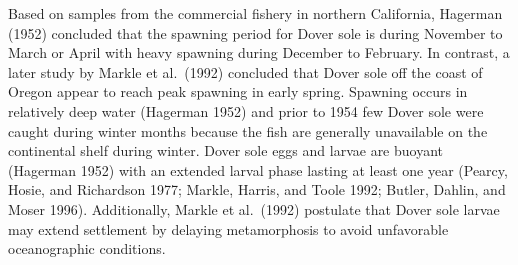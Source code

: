 \documentclass[11pt,
  english,
  a4paper,
]{article}
\begin{document}
\leavevmode\tagmcend\tagstructend\par


Based on samples from the commercial fishery in northern California, Hagerman {(1952)\leavevmode\tagmcend\tagstructend} concluded that the spawning period for Dover sole is during November to March or April with heavy spawning during December to February. In contrast, a later study by Markle et al.~{(1992)\leavevmode\tagmcend\tagstructend} concluded that Dover sole off the coast of Oregon appear to reach peak spawning in early spring. Spawning occurs in relatively deep water {(Hagerman 1952)\leavevmode\tagmcend\tagstructend} and prior to 1954 few Dover sole were caught during winter months because the fish are generally unavailable on the continental shelf during winter. Dover sole eggs and larvae are buoyant {(Hagerman 1952)\leavevmode\tagmcend\tagstructend} with an extended larval phase lasting at least one year {(Pearcy, Hosie, and Richardson 1977; Markle, Harris, and Toole 1992; Butler, Dahlin, and Moser 1996)\leavevmode\tagmcend\tagstructend}. Additionally, Markle et al.~{(1992)\leavevmode\tagmcend\tagstructend} postulate that Dover sole larvae may extend settlement by delaying metamorphosis to avoid unfavorable oceanographic conditions.

\leavevmode\tagmcend\tagstructend\par

\end{document}

